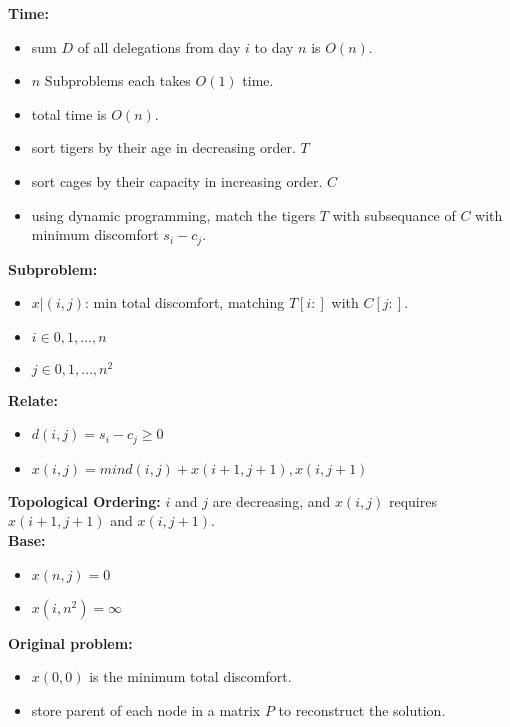 \documentclass[12pt,twoside]{article}
\begin{document}
\begin{problems}
  \textbf{Time:} 
  \begin{itemize}
    \item sum $D$ of all delegations from day $i$ to day $n$ is $O(n)$.
    \item $n$ Subproblems each takes $O(1)$ time. 
    \item total time is $O(n)$.
  \end{itemize}
\newpage
\problem  %
\begin{itemize}
  \item sort tigers by their age in decreasing order. $T$
  \item sort cages by their capacity in increasing order. $C$
  \item using dynamic programming, match the tigers $T$ with subsequance of $C$ with minimum discomfort $s_i - c_j$.
\end{itemize}
  \textbf{Subproblem:}
  \begin{itemize}
    \item $x|(i, j)$: min total discomfort, matching $T[i:]$ with $C[j:]$.
    \item $i \in {0, 1, \dots, n}$
    \item $j \in {0, 1, \dots, n^2}$
  \end{itemize}

  \textbf{Relate:}
  \begin{itemize}
    \item $d(i,j) = s_i - c_j \geq 0$
    \item $x(i, j) = min{d(i, j) + x(i + 1, j +1), x(i, j+1)}$
  \end{itemize}
  
  \textbf{Topological Ordering:} $i$ and $j$ are decreasing, and $x(i, j)$ requires $x(i + 1, j + 1)$ and $x(i, j + 1)$. \\

  \textbf{Base:}
  \begin{itemize}
    \item $x(n, j) = 0$
    \item $x(i, n^2) = \infty$
  \end{itemize}

  \textbf{Original problem:}
  \begin{itemize}
    \item $x(0, 0)$ is the minimum total discomfort.
    \item store parent of each node in a matrix $P$ to reconstruct the solution.
  \end{itemize}


\end{problems}
\end{document}
